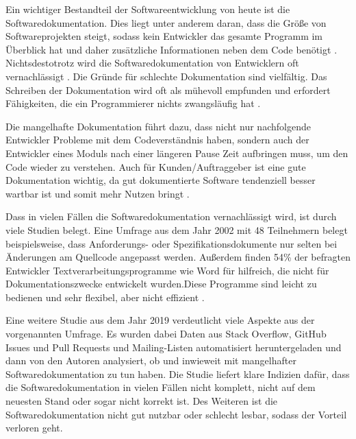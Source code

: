 \label{sec:introduction}

Ein wichtiger Bestandteil der Softwareentwicklung von heute ist die Softwaredokumentation. Dies liegt unter anderem daran, dass die Größe von Softwareprojekten steigt, sodass kein Entwickler das gesamte Programm im Überblick hat und daher zusätzliche Informationen neben dem Code benötigt \cite[S. 1]{StaticAnalysis:AnIntroduction:TheFundamentalChallengeofSoftwareEngineeringisOneofComplexity.}. Nichtsdestotrotz wird die Softwaredokumentation von Entwicklern oft vernachlässigt \cite[S. 83]{Qualityanalysisofsourcecodecomments}.  Die Gründe für schlechte Dokumentation sind vielfältig. Das Schreiben der Dokumentation wird oft als mühevoll empfunden und erfordert Fähigkeiten, die ein Programmierer nichts zwangsläufig hat\cite[S. 70]{AutomaticQualityAssessmentofSourceCodeComments:TheJavadocMiner} \cite[S. 593]{Softwareengineeringandsoftwaredocumentation:aunifiedlongcourse}.  

Die mangelhafte Dokumentation führt dazu, dass nicht nur nachfolgende Entwickler Probleme mit dem Codeverständnis haben, sondern auch der Entwickler eines Moduls nach einer längeren Pause Zeit aufbringen muss, um den Code wieder zu verstehen. \cite[S. 511]{vestdam} Auch für Kunden/Auftraggeber ist eine gute Dokumentation wichtig, da gut dokumentierte Software tendenziell besser wartbar ist und somit mehr Nutzen bringt \cite[S. 83]{Qualityanalysisofsourcecodecomments}\cite[S. 1]{SoftwareDocumentationManagementIssuesandPractices:ASurvey}.


Dass in vielen Fällen die Softwaredokumentation vernachlässigt wird, ist durch viele Studien belegt. Eine Umfrage aus dem Jahr 2002 mit 48 Teilnehmern belegt beispielsweise, dass Anforderungs- oder Spezifikationsdokumente nur selten bei Änderungen am Quellcode angepasst werden. Außerdem finden 54\% der befragten Entwickler  Textverarbeitungsprogramme wie Word für hilfreich, die nicht für Dokumentationszwecke entwickelt wurden.Diese Programme sind leicht zu bedienen und sehr flexibel, aber nicht effizient  \cite[S. 28-29]{TheRelevanceofSoftwareDocumentationToolsandTechnologies:ASurvey}. 

Eine weitere Studie aus dem Jahr 2019 verdeutlicht viele Aspekte aus der vorgenannten Umfrage. Es wurden dabei Daten aus Stack Overflow, GitHub Issues und Pull Requests und Mailing-Listen automatisiert heruntergeladen und dann von den Autoren analysiert, ob und inwieweit mit mangelhafter Softwaredokumentation zu tun haben.  Die Studie liefert klare Indizien dafür, dass die Softwaredokumentation in vielen Fällen nicht komplett, nicht auf dem neuesten Stand oder sogar nicht korrekt ist. Des Weiteren ist die Softwaredokumentation nicht gut nutzbar oder schlecht lesbar, sodass der Vorteil verloren geht\cite[S.1201 -1204]{SoftwareDocumentationIssuesUnveiled}.







